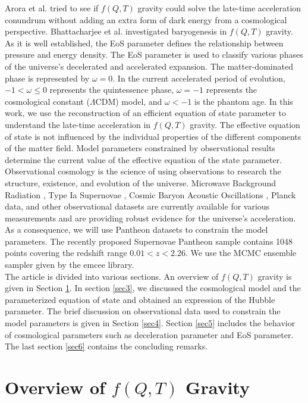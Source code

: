 Arora et al. \cite{Arora} tried to see if $f(Q,T)$ gravity could solve the late-time acceleration conundrum without adding an extra form of dark energy from a cosmological perspective. Bhattacharjee et al. \cite{Bhattacharjee} investigated baryogenesis in $f(Q,T)$ gravity.\\
As it is well established, the EoS parameter defines the relationship between pressure and energy density. The EoS parameter is used to classify various phases of the universe's decelerated and accelerated expansion. The matter-dominated phase is represented by $\omega=0$. In the current accelerated period of evolution, $-1<\omega\leq 0$ represents the quintessence phase, $\omega=-1$ represents the cosmological constant ($\Lambda$CDM) model, and $\omega<-1$ is the phantom age. In this work, we use the reconstruction of an efficient equation of state parameter to understand the late-time acceleration in $f(Q,T)$ gravity. The effective equation of state is not influenced by the individual properties of the different components of the matter field. Model parameters constrained by observational results determine the current value of the effective equation of the state parameter. Observational cosmology is the science of using observations to research the structure, existence, and evolution of the universe. Microwave Background Radiation \cite{Eisenstein}, Type Ia Supernovae \cite{Riess,Perlmutter}, Cosmic Baryon Acoustic Oscillations \cite{Spergel}, Planck data, and other observational datasets are currently available for various measurements and are providing robust evidence for the universe's acceleration. As a consequence, we will use Pantheon datasets \cite{Scolnic} to constrain the model parameters. The recently proposed Supernovae Pantheon sample contains 1048 points covering the redshift range $0.01<z<2.26$. We use the MCMC ensemble sampler given by the emcee library.\\
The article is divided into various sections.  An overview of $f(Q,T)$ gravity is given in Section \ref{sec2}. In section \ref{sec3}, we discussed the cosmological model and the parameterized equation of state and obtained an expression of the Hubble parameter. The brief discussion on observational data used to constrain the model parameters is given in Section \ref{sec4}. Section \ref{sec5} includes the behavior of cosmological parameters such as deceleration parameter and EoS parameter. The last section \ref{sec6} contains the concluding remarks. 

\section{Overview of $f(Q,T)$ Gravity}\label{sec2}

